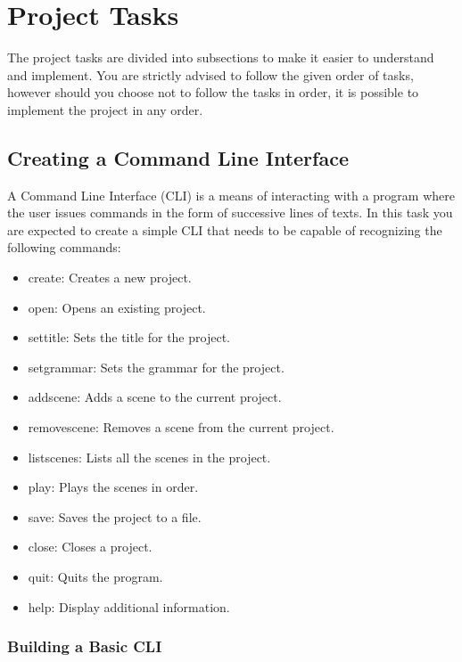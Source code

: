 \documentclass[a4paper]{article}
\begin{document}
	\newpage
	
	\section{Project Tasks}
	\label{tasks}
	The project tasks are divided into subsections to make it easier to understand and implement. You are strictly advised to follow the given order of tasks, however should you choose not to follow the tasks in order, it is possible to implement the project in any order.
	
	\subsection{Creating a Command Line Interface}
	A Command Line Interface (CLI) is a means of interacting with a program where the user issues commands in the form of successive lines of texts. In this task you are expected to create a simple CLI that needs to be capable of recognizing the following commands:
	\label{commands}
	\begin{itemize}
		\item create: Creates a new project.
		\item open: Opens an existing project.
		\item settitle: Sets the title for the project.
		\item setgrammar: Sets the grammar for the project.
		\item addscene: Adds a scene to the current project.
		\item removescene: Removes a scene from the current project.
		\item listscenes: Lists all the scenes in the project.
		\item play: Plays the scenes in order.
		\item save: Saves the project to a file.
		\item close: Closes a project.
		\item quit: Quits the program.
		\item help: Display additional information.
	\end{itemize}
	
	\subsubsection{Building a Basic CLI}
	
\end{document}
